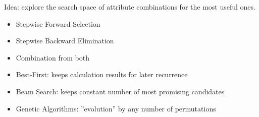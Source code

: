 \begin{breakbox}
Idea: explore the search space of attribute combinations for the most useful ones.
\begin{itemize}
	\item Stepwise Forward Selection
	\item Stepwise Backward Elimination
	\item Combination from both
	\item Best-First: keeps calculation results for later recurrence
	\item Beam Search: keeps constant number of most promising candidates
	\item Genetic Algorithms: ''evolution'' by any number of permutations
\end{itemize}
\end{breakbox}


